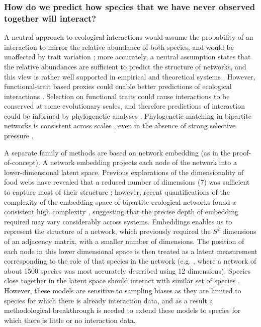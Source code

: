 \subsubsection{How do we predict how species that we have never observed
together will
interact?}\label{how-do-we-predict-how-species-that-we-have-never-observed-together-will-interact}

A neutral approach to ecological interactions would assume the
probability of an interaction to mirror the relative abundance of both
species, and would be unaffected by trait variation
\cite{Poisot2015SpeWhy, Pichler2020MacLea}; more accurately, a neutral
assumption states that the relative abundances are sufficient to predict
the structure of networks, and this view is rather well supported in
empirical and theoretical systems \cite{Canard2012EmeStr,
Canard2014EmpEva}. However, functional-trait based proxies could
enable better predictions of ecological interactions
\cite{Cirtwill2018FeeEnv, Cirtwill2019QuaFra, Bartomeus2016ComFra,
Bartomeus2013UndLin}. Selection on functional traits could cause
interactions to be conserved at some evolutionary scales, and therefore
predictions of interaction could be informed by phylogenetic analyses
\cite{Davies2021EcoRed, Elmasri2020HieBay, Gomez2010EcoInt}.
Phylogenetic matching in bipartite networks is consistent across scales
\cite{Poisot2018IntRet}, even in the absence of strong selective
pressure \cite{Coelho2017NeuBio}.

A separate family of methods are based on network embedding (as in the
proof-of-concept). A network embedding projects each node of the network
into a lower-dimensional latent space. Previous explorations of the
dimensionality of food webs have revealed that a reduced number of
dimensions (7) was sufficient to capture most of their structure
\cite{Eklof2013DimEco}; however, recent quantifications of the
complexity of the embedding space of bipartite ecological networks found
a consistent high complexity \cite{Strydom2021SvdEnt}, suggesting that
the precise depth of embedding required may vary considerably across
systems. Embeddings enables us to represent the structure of a network,
which previously required the \(S^2\) dimensions of an adjacency matrix,
with a smaller number of dimensions. The position of each node in this
lower dimensional space is then treated as a latent measurement
corresponding to the role of that species in the network (e.g.
\cite{Poisot2021ImpMam}, where a network of about 1500 species was most
accurately described using 12 dimensions). Species close together in
the latent space should interact with similar set of species
\cite{Rossberg2006FooWeb, Rohr2010ModFoo}. However, these models are
sensitive to sampling biases as they are limited to species for which
there is already interaction data, and as a result a methodological
breakthrough is needed to extend these models to species for which there
is little or no interaction data.

